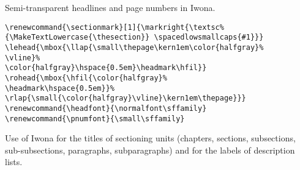 Semi-transparent headlines and page numbers in Iwona.
\begin{lstlisting}
\renewcommand{\sectionmark}[1]{\markright{\textsc%
{\MakeTextLowercase{\thesection}} \spacedlowsmallcaps{#1}}}
\lehead{\mbox{\llap{\small\thepage\kern1em\color{halfgray}%
\vline}%
\color{halfgray}\hspace{0.5em}\headmark\hfil}}
\rohead{\mbox{\hfil{\color{halfgray}%
\headmark\hspace{0.5em}}%
\rlap{\small{\color{halfgray}\vline}\kern1em\thepage}}}
\renewcommand{\headfont}{\normalfont\sffamily}
\renewcommand{\pnumfont}{\small\sffamily}
\end{lstlisting}



Use of Iwona for the titles of sectioning units (chapters, sections, subsections, sub-subsections, paragraphs, subparagraphs) and for the labels of description lists.
